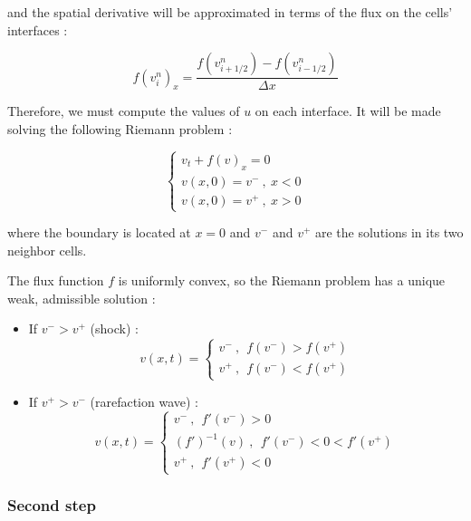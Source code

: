 \noindent and the spatial derivative will be approximated in terms of the flux on the cells' interfaces : 

\begin{equation}
f(v_i^n)_x = \frac{f\left(v_{i+1/2}^n\right) - f\left(v_{i-1/2}^n\right)}{\Delta x}
\end{equation}

\indent Therefore, we must compute the values of $u$ on each interface. It will be made solving the following Riemann problem :

\begin{equation}
\begin{cases}
v_t + f(v)_x = 0 \\
v(x,0) = v^- \ , \ x < 0 \\
v(x,0) = v^+ \ , \ x > 0
\end{cases}
\end{equation}

\noindent where the boundary is located at $x=0$ and $v^-$ and $v^+$ are the solutions in its two neighbor cells.

\indent The flux function $f$ is uniformly convex, so the Riemann problem has a unique weak, admissible solution \cite{conservationLaws2002} : 

\begin{itemize}
\item  If $v^- > v^+$  (shock) : 
\begin{equation}
v(x,t) = 
\begin{cases}
v^- \ ,\ \   f(v^-) > f(v^+) \\
v^+ \ ,\ \ f(v^-) < f(v^+)
\end{cases}
\end{equation}

\item If $v^+ > v^-$  (rarefaction wave) :
\begin{equation}
v(x,t) = 
\begin{cases}
v^- \ ,\ \ f'(v^-) > 0 \\
\left(f'\right)^{-1}(v) \ ,\ \ f'(v^-) < 0 < f'(v^+) \\
v^+ \ ,\ \ f'(v^+) < 0 
\end{cases}
\end{equation}
\end{itemize}


\subsubsection{Second step}

